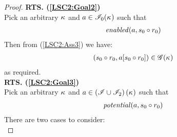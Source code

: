 \begin{lemma}
\begin{proof}
\noindent\textbf{RTS. (\ref{LSC2:Goal2})} \\
Pick an arbitrary $\kappa_{}$ and $a \in \mathscr{I}_0(\kappa_{})$ such that
%
\begin{align*}
	\mathit{enabled}(a, s_0 \circ r_0) 
\end{align*}
Then from (\ref{LSC2:Ass3}) we have:
%
\begin{align*}
	(s_0 \circ r_0, a[s_0 \circ r_0]) \in \mathscr{G}(\kappa_{})
\end{align*}
%
as required.\\
%
%
%
%

\noindent\textbf{RTS. (\ref{LSC2:Goal3})} \\
Pick an arbitrary $\kappa_{}$ and $a \in \left(\mathscr{I} \cup \mathscr{I}_2 \right)(\kappa_{})$ such that
%
\begin{align}
	\mathit{potential}(a, s_0 \circ r_0) \label{LSC2:Ass25}
\end{align}
There are two cases to consider:\\


\end{proof}
\end{lemma}
